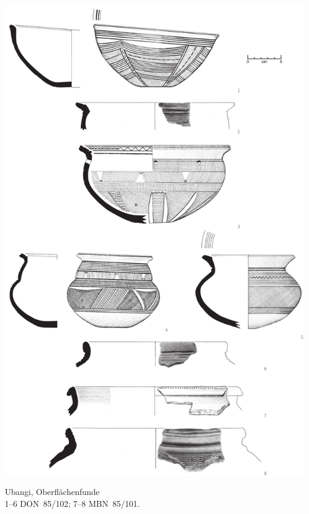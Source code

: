 \begin{pl}[H]
	\includegraphics{plt/Taf9.pdf}
	\vspace{.75em}\caption{\mbox{Ubangi}, Oberflächenfunde \\ 1--6 DON~85/102; 7--8 MBN~85/101.}
	\label{pl:9}
\end{pl}

